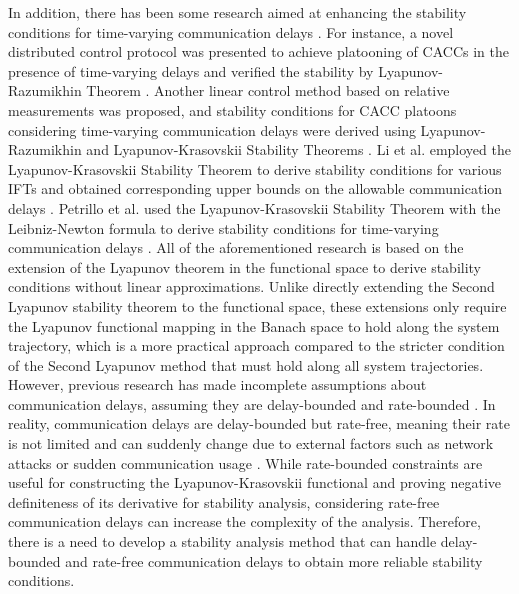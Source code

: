 \documentclass[a4paper]{cas-sc}
\begin{document}
In addition, there has been some research aimed at enhancing the stability conditions for time-varying communication delays \citep{8443027,garagic2005delay}. For instance, a novel distributed control protocol was presented to achieve platooning of CACCs in the presence of time-varying delays and verified the stability by Lyapunov-Razumikhin Theorem \citep{6891349}. Another linear control method based on relative measurements was proposed, and stability conditions for CACC platoons considering time-varying communication delays were derived using Lyapunov-Razumikhin and Lyapunov-Krasovskii Stability Theorems \citep{chehardoli2017stable}. Li et al. employed the Lyapunov-Krasovskii Stability Theorem to derive stability conditions for various IFTs and obtained corresponding upper bounds on the allowable communication delays \citep{9663029,8464292}. Petrillo et al. used the Lyapunov-Krasovskii Stability Theorem with the Leibniz-Newton formula to derive stability conditions for time-varying communication delays \citep{PETRILLO2018372}. All of the aforementioned research is based on the extension of the Lyapunov theorem in the functional space to derive stability conditions without linear approximations. Unlike directly extending the Second Lyapunov stability theorem to the functional space, these extensions only require the Lyapunov functional mapping in the Banach space to hold along the system trajectory, which is a more practical approach compared to the stricter condition of the Second Lyapunov method that must hold along all system trajectories. However, previous research has made incomplete assumptions about communication delays, assuming they are delay-bounded and rate-bounded \citep{Moreau2005,Angeli2006}. In reality, communication delays are delay-bounded but rate-free, meaning their rate is not limited and can suddenly change due to external factors such as network attacks or sudden communication usage \citep{Xiao2008a,9348743,QIN201739}. While rate-bounded constraints are useful for constructing the Lyapunov-Krasovskii functional and proving negative definiteness of its derivative for stability analysis, considering rate-free communication delays can increase the complexity of the analysis. Therefore, there is a need to develop a stability analysis method that can handle delay-bounded and rate-free communication delays to obtain more reliable stability conditions.
\end{document}
